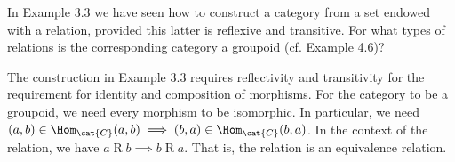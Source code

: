 \documentclass[parskip=full, draft]{scrartcl}
\begin{document}
\begin{prob}{2}
    In Example 3.3 we have seen how to construct a category from a set endowed with a relation, provided this latter is reflexive and transitive. For what types of relations is the corresponding category a groupoid (cf. Example 4.6)?
\end{prob}
\begin{sol}
    The construction in Example 3.3 requires reflectivity and transitivity for the requirement for identity and composition of morphisms. For the category to be a groupoid, we need every morphism to be isomorphic. In particular, we need \((a, b) \in \Hom_{\cat{C}}(a, b) \implies (b, a) \in \Hom_{\cat{C}}(b, a)\). In the context of the relation, we have \(a\mathrel{R}b \implies b\mathrel{R}a\). That is, the relation is an equivalence relation.
\end{sol}
\end{document}
